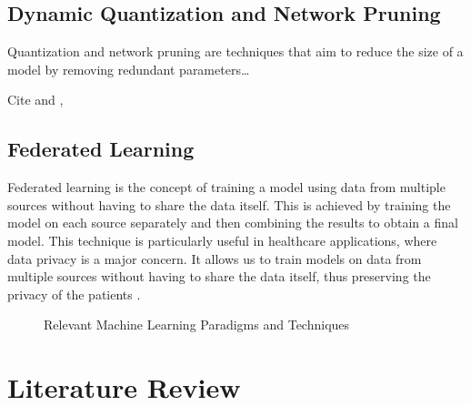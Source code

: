 \documentclass[../main.tex]{subfiles}
\begin{document}
    \subsection{Dynamic Quantization and Network Pruning} \label{sec:dynamic_quantization_pruning_sparsification} 

    Quantization and network pruning are techniques that aim to reduce the size of a model by removing redundant parameters\dots

    Cite \cite{carreira-perpinan_model_2017} and \cite{han_deep_2016}, \cite{carreira-perpinan_compression_2018}

   
    \subsection{Federated Learning} \label{sec:federated_learning} 

    Federated learning is the concept of training a model using data from multiple sources without having to share the data itself. This is achieved by training the model on each source separately and then combining the results to obtain a final model. This technique is particularly useful in healthcare applications, where data privacy is a major concern. It allows us to train models on data from multiple sources without having to share the data itself, thus preserving the privacy of the patients \cite{joshi_federated_2022}.


    \newpage

    \begin{figure}
        \centering
        \caption{Relevant Machine Learning Paradigms and Techniques}
        \resizebox*{1.1\columnwidth}{!}{
            \hspace*{-3cm}
            
        }
        \label{fig:relevant_ml_paradigms}
    \end{figure}
    \clearpage

    \section{Literature Review} \label{sec:literature_review} 
\end{document}
